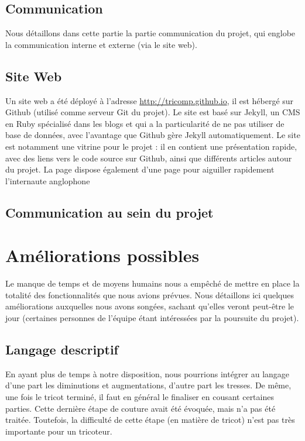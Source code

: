 \documentclass{article}
\begin{document}
\subsection{Communication}

Nous détaillons dans cette partie la partie communication du projet,
qui englobe la communication interne et externe (via le site web).

\subsection{Site Web}

Un site web a été déployé à l'adresse \url{http://tricomp.github.io}, il est hébergé
sur Github (utilisé comme serveur Git du projet). Le site est basé sur Jekyll, un 
CMS en Ruby spécialisé dans les blogs et qui a la particularité de ne pas utiliser 
de base de données, avec l'avantage que Github gère Jekyll automatiquement. Le site 
est notamment une vitrine pour le projet : il en contient une présentation rapide, 
avec des liens vers le code source sur Github, ainsi que différents articles autour du projet.
La page dispose également d'une page pour aiguiller rapidement l'internaute anglophone


\subsection{Communication au sein du projet}

\section{Améliorations possibles}

Le manque de temps et de moyens humains nous a empêché de mettre en
place la totalité des fonctionnalités que nous avions prévues. Nous détaillons
ici quelques améliorations auxquelles nous avons songées, sachant qu'elles veront
peut-être le jour (certaines personnes de l'équipe étant intéressées par la 
poursuite du projet).

\subsection{Langage descriptif}

En ayant plus de temps à notre disposition, nous pourrions intégrer au
langage d'une part les diminutions et augmentations, d'autre part les
tresses. De même, une fois le tricot terminé, il faut en général le
finaliser en cousant certaines parties. Cette dernière étape de
couture avait été évoquée, mais n'a pas été traitée. Toutefois, la
difficulté de cette étape (en matière de tricot) n'est pas très
importante pour un tricoteur.
\end{document}
